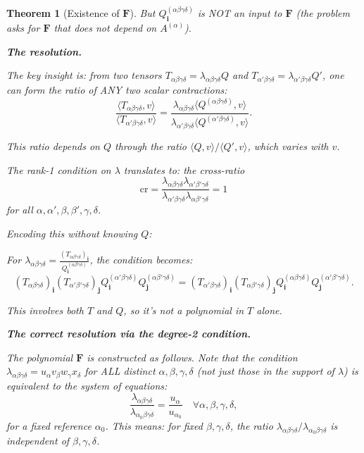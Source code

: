 \documentclass[12pt]{article}
\newtheorem{theorem}{Theorem}
\begin{document}
\begin{theorem}[Existence of $\mathbf{F}$]
But $Q^{(\alpha\beta\gamma\delta)}_\mathbf{i}$ is NOT an input to $\mathbf{F}$ (the problem asks for $\mathbf{F}$ that does not depend on $A^{(\alpha)}$).

\textbf{The resolution.}

The key insight is: from two tensors $T_{\alpha\beta\gamma\delta} = \lambda_{\alpha\beta\gamma\delta}Q$ and $T_{\alpha'\beta\gamma\delta} = \lambda_{\alpha'\beta\gamma\delta}Q'$, one can form the ratio of ANY two scalar contractions:
\[
\frac{\langle T_{\alpha\beta\gamma\delta}, v\rangle}{\langle T_{\alpha'\beta\gamma\delta}, v\rangle} = \frac{\lambda_{\alpha\beta\gamma\delta} \langle Q^{(\alpha\beta\gamma\delta)}, v\rangle}{\lambda_{\alpha'\beta\gamma\delta} \langle Q^{(\alpha'\beta\gamma\delta)}, v\rangle}.
\]

This ratio depends on $Q$ through the ratio $\langle Q, v\rangle / \langle Q', v\rangle$, which varies with $v$.

The rank-1 condition on $\lambda$ translates to: the cross-ratio
\[
\text{cr} = \frac{\lambda_{\alpha\beta\gamma\delta}\lambda_{\alpha'\beta'\gamma\delta}}{\lambda_{\alpha'\beta\gamma\delta}\lambda_{\alpha\beta'\gamma\delta}} = 1
\]
for all $\alpha, \alpha', \beta, \beta', \gamma, \delta$.

Encoding this without knowing $Q$:

For $\lambda_{\alpha\beta\gamma\delta} = \frac{(T_{\alpha\beta\gamma\delta})_\mathbf{i}}{Q^{(\alpha\beta\gamma\delta)}_\mathbf{i}}$, the condition becomes:
\[
(T_{\alpha\beta\gamma\delta})_\mathbf{i} (T_{\alpha'\beta'\gamma\delta})_\mathbf{j} Q^{(\alpha'\beta\gamma\delta)}_\mathbf{i} Q^{(\alpha\beta'\gamma\delta)}_\mathbf{j} = (T_{\alpha'\beta\gamma\delta})_\mathbf{i} (T_{\alpha\beta'\gamma\delta})_\mathbf{j} Q^{(\alpha\beta\gamma\delta)}_\mathbf{i} Q^{(\alpha'\beta'\gamma\delta)}_\mathbf{j}.
\]

This involves both $T$ and $Q$, so it's not a polynomial in $T$ alone.

\textbf{The correct resolution via the degree-2 condition.}

The polynomial $\mathbf{F}$ is constructed as follows. Note that the condition $\lambda_{\alpha\beta\gamma\delta} = u_\alpha v_\beta w_\gamma x_\delta$ for ALL distinct $\alpha,\beta,\gamma,\delta$ (not just those in the support of $\lambda$) is equivalent to the system of equations:
\[
\frac{\lambda_{\alpha\beta\gamma\delta}}{\lambda_{\alpha_0\beta\gamma\delta}} = \frac{u_\alpha}{u_{\alpha_0}} \quad \forall \alpha, \beta, \gamma, \delta,
\]
for a fixed reference $\alpha_0$. This means: for fixed $\beta, \gamma, \delta$, the ratio $\lambda_{\alpha\beta\gamma\delta}/\lambda_{\alpha_0\beta\gamma\delta}$ is independent of $\beta, \gamma, \delta$.


\end{theorem}
\end{document}
